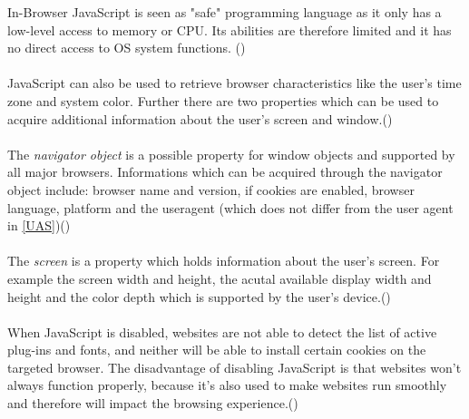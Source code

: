 In-Browser JavaScript is seen as "safe" programming language as it only has a low-level access to memory or CPU. Its abilities are therefore limited and it has no direct access to OS system functions. (\textcite{jsinfo})\\\\
JavaScript can also be used to retrieve browser characteristics like the user's time zone and system color. Further there are two properties which can be used to acquire additional information about the user's screen and window.(\textcite{web17})\\\\
The \textit{navigator object} is a possible property for window objects and supported by all major browsers. Informations which can be acquired through the navigator object include: browser name and version, if cookies are enabled, browser language, platform and the useragent (which does not differ from the user agent in \autoref{UAS})(\textcite{web17})\\\\
The \textit{screen} is a property which holds information about the user's screen. For example the screen width and height, the acutal available display width and height and the color depth which is supported by the user's device.(\textcite{web17})\\\\
When JavaScript is disabled, websites are not able to detect the list of active plug-ins and fonts, and neither will be able to install certain cookies on the targeted browser. The disadvantage of disabling JavaScript is that websites won’t always function properly, because it’s also used to make websites run smoothly and therefore will impact the browsing experience.(\textcite{pixel18})



